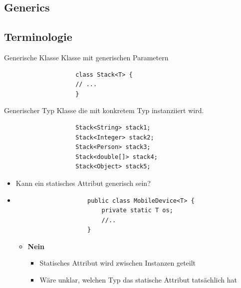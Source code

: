 \documentclass[a4paper, landscape, 8pt]{scrartcl}
\begin{document}
    \begin{multicols*}{4}
        \setlength{\columnseprule}{0.4pt}
        \footnotesize

        \section{Generics}
            \subsection{Terminologie}
                \textcolor{subsectioncolor}{Generische Klasse}
                \newline
                Klasse mit \textcolor{subsectioncolor}{generischen Parametern}
                \begin{lstlisting}
                    class Stack<T> {
                    // ...
                    }
                \end{lstlisting}

                \textcolor{subsectioncolor}{Generischer Typ}
                \newline
                Klasse die mit \textcolor{subsectioncolor}{konkretem Typ} instanziiert wird.
                \begin{lstlisting}
                    Stack<String> stack1;
                    Stack<Integer> stack2;
                    Stack<Person> stack3;
                    Stack<double[]> stack4;
                    Stack<Object> stack5;
                \end{lstlisting}
                \begin{itemize}
                    \item Kann ein statisches Attribut generisch sein?
                    \item \begin{lstlisting}
                    public class MobileDevice<T> {
                        private static T os;
                        //..
                    }
                    \end{lstlisting}
                    \begin{itemize}
                        \item {\bfseries Nein}
                        \begin{itemize}
                            \item Statisches Attribut wird zwischen Instanzen geteilt
                            \item Wäre unklar, welchen Typ das statische Attribut tatsächlich hat
                        \end{itemize}
                    \end{itemize}
                \end{itemize}


\end{multicols*}
\end{document}
